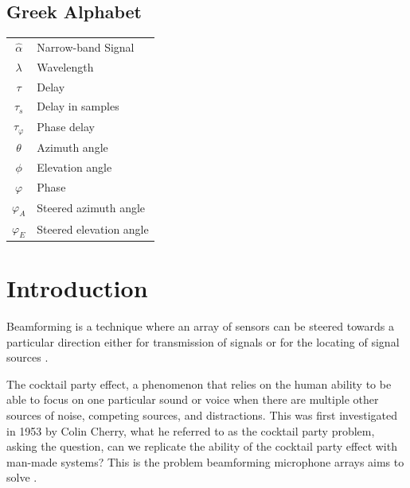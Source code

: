 \documentclass{UoNMCHA}
\numberwithin{equation}{section}
\begin{document}
    \subsection*{Greek Alphabet}
    \begin{table}[H]
        \begin{tabular}{cl}
            $\hat{\alpha}$&Narrow-band Signal\\
            $\lambda$&Wavelength\\
            $\tau$&Delay\\
            $\tau_s$&Delay in samples\\
            $\tau_\varphi$&Phase delay\\
            $\theta$&Azimuth angle\\
            $\phi$&Elevation angle\\
            $\varphi$&Phase\\
            $\varphi_A$&Steered azimuth angle\\
            $\varphi_E$&Steered elevation angle
        \end{tabular}
    \end{table}
\newpage
\onehalfspacing
\section{Introduction} \label{sec:Introduction}
    
    Beamforming is a technique where an array of sensors can be steered towards a particular direction either for transmission of signals or for the locating of signal sources \citep{Sha18}.
    
    The cocktail party effect, a phenomenon that relies on the human ability to be able to focus on one particular sound or voice when there are multiple other sources of noise, competing sources, and distractions. This was first investigated in 1953 by Colin Cherry, what he referred to as the cocktail party problem, asking the question, can we replicate the ability of the cocktail party effect with man-made systems? This is the problem beamforming microphone arrays aims to solve \citep{Ben08}.
    
\end{document}
